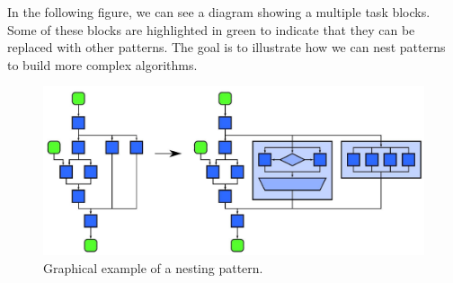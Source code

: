 \highspace
In the following figure, we can see a diagram showing a multiple task blocks. Some of these blocks are highlighted in green to indicate that they can be replaced with other patterns. The goal is to illustrate how we can nest patterns to build more complex algorithms.
\begin{figure}[!htp]
    \centering
    \includegraphics[width=.7\textwidth]{img/nesting-pattern-1.pdf}
    \caption{Graphical example of a nesting pattern.}
\end{figure}